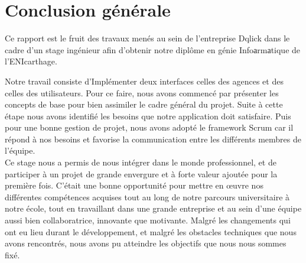 \chapter*{Conclusion générale}
Ce rapport est le fruit des travaux menés au sein de l’entreprise Dqlick dans le cadre d'un stage ingénieur afin d'obtenir notre diplôme en génie Infoаrmаtique de l’ENIcarthage.

Notre travail consiste d’Implémenter deux interfaces celles des agences et des celles des utilisateurs.
Pour ce faire, nous avons commencé par présenter les concepts de base pour bien assimiler le cadre général du projet. Suite à cette étape nous avons identifié les besoins que notre application doit
satisfaire. Puis pour une bonne gestion de projet, nous avons adopté le framework Scrum car il répond à nos besoins et favorise la communication entre les différents membres de l’équipe.\\
Ce stage nous a permis de nous intégrer dans le monde professionnel, et de participer à un projet de grande envergure et à forte valeur ajoutée pour la première fois.
C’était une bonne opportunité pour mettre en œuvre nos différentes compétences acquises tout au long
de notre parcours universitaire à notre école, tout en travaillant dans une grande entreprise et au sein
d’une équipe aussi bien collaboratrice, innovante que motivante.
Malgré les changements qui ont eu lieu durant le développement, et malgré les obstacles techniques
que nous avons rencontrés, nous avons pu atteindre les objectifs que nous nous sommes fixé.


